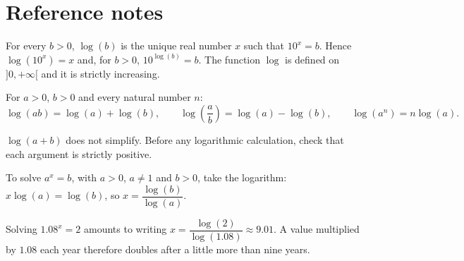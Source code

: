 
\section{Reference notes}
\begin{keypoint}
For every $b>0$, $\log(b)$ is the unique real number $x$ such that $10^x=b$. Hence $\log(10^x)=x$ and, for $b>0$, $10^{\log(b)}=b$. The function $\log$ is defined on $]0,+\infty[$ and it is strictly increasing.
\end{keypoint}

\begin{center}
\end{center}

For $a>0$, $b>0$ and every natural number $n$:
\[
\log(ab)=\log(a)+\log(b),\qquad
\log\!\left(\frac{a}{b}\right)=\log(a)-\log(b),\qquad
\log(a^n)=n\log(a).
\]

\begin{pitfall}
$\log(a+b)$ does not simplify. Before any logarithmic calculation, check that each argument is strictly positive.
\end{pitfall}

\begin{method}
To solve $a^x=b$, with $a>0$, $a\neq1$ and $b>0$, take the logarithm: $x\log(a)=\log(b)$, so $x=\dfrac{\log(b)}{\log(a)}$.
\end{method}

\begin{example}
Solving $\num{1,08}^x=2$ amounts to writing $x=\dfrac{\log(2)}{\log(\num{1,08})}\approx\num{9,01}$. A value multiplied by $\num{1,08}$ each year therefore doubles after a little more than nine years.
\end{example}

